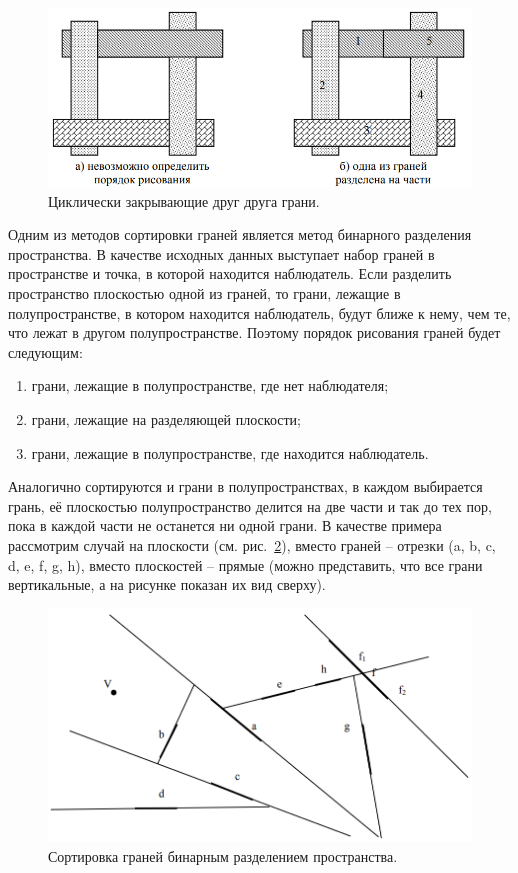 \begin{figure}[H]
    \centering
    \includegraphics[width=\textwidth]{img/artist_algorithm_2.png}
    \caption{Циклически закрывающие друг друга грани.}
    \label{fig:artist_algorithm_2}
\end{figure}

Одним из методов сортировки граней является метод бинарного разделения пространства. В качестве исходных данных выступает набор граней в пространстве и точка, в которой находится наблюдатель. Если разделить пространство плоскостью одной из граней, то грани, лежащие в полупространстве, в котором находится наблюдатель, будут ближе к нему, чем те, что лежат в другом полупространстве. Поэтому порядок рисования граней будет следующим:

\begin{enumerate}
\item грани, лежащие в полупространстве, где нет наблюдателя;
\item грани, лежащие на разделяющей плоскости;
\item грани, лежащие в полупространстве, где находится наблюдатель.
\end{enumerate}

Аналогично сортируются и грани в полупространствах, в каждом выбирается грань, её плоскостью полупространство делится на две части и так до тех пор, пока в каждой части не останется ни одной грани.
В качестве примера рассмотрим случай на плоскости (см. рис.~\ref{fig:artist_algorithm_3}),
вместо граней – отрезки (a, b, c, d, e, f, g, h), вместо плоскостей – прямые (можно представить, что все грани вертикальные, а на рисунке показан их вид сверху).

\begin{figure}[H]
    \centering
    \includegraphics[width=\textwidth]{img/artist_algorithm_3.png}
    \caption{Сортировка граней бинарным разделением пространства.}
    \label{fig:artist_algorithm_3}
\end{figure}

